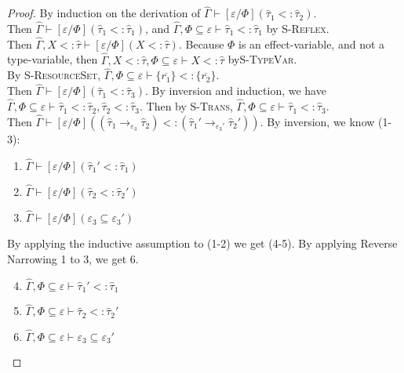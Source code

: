 \documentclass{llncs}
\begin{document}
\begin{proof} By induction on the derivation of $\hat \Gamma \vdash [\varepsilon/\Phi](\hat \tau_1 <: \hat \tau_2)$.\\

 Then $\hat \Gamma \vdash [\varepsilon/\Phi](\hat \tau_1 <: \hat \tau_1)$, and $\hat \Gamma, \Phi \subseteq \varepsilon \vdash \hat \tau_1 <: \hat \tau_1$ by \textsc{S-Reflex}.\\

 Then $\hat \Gamma, X <: \hat \tau \vdash [\varepsilon/\Phi](X <: \hat \tau)$. Because $\Phi$ is an effect-variable, and not a type-variable, then $\hat \Gamma, X <: \hat \tau, \Phi \subseteq \varepsilon \vdash X <: \hat \tau$ by\textsc{S-TypeVar}.\\

 By \textsc{S-ResourceSet}, $\hat \Gamma, \Phi \subseteq \varepsilon \vdash \{ \overline{r_1} \} <: \{ \overline{r_2} \}$.\\

 Then $\hat \Gamma \vdash [\varepsilon/\Phi](\hat \tau_1 <: \hat \tau_3)$. By inversion and induction, we have $\hat \Gamma, \Phi \subseteq \varepsilon \vdash \hat \tau_1 <: \hat \tau_2, \hat \tau_2 <: \hat \tau_3$. Then by \textsc{S-Trans}, $\hat \Gamma, \Phi \subseteq \varepsilon \vdash \hat \tau_1 <: \hat \tau_3$.\\

 Then $\hat \Gamma \vdash [\varepsilon/\Phi]((\hat \tau_1 \rightarrow_{\varepsilon_3} \hat \tau_2) <: (\hat \tau_1' \rightarrow_{\varepsilon_3'} \hat \tau_2'))$. By inversion, we know (1-3):

\begin{enumerate}
	\item $\hat \Gamma \vdash [\varepsilon/\Phi](\hat \tau_1' <: \hat \tau_1)$
	\item $\hat \Gamma \vdash [\varepsilon/\Phi](\hat \tau_2 <: \hat \tau_2')$
	\item $\hat \Gamma \vdash [\varepsilon/\Phi](\varepsilon_3 \subseteq \varepsilon_3')$
\end{enumerate}

\noindent
By applying the inductive assumption to (1-2) we get (4-5). By applying Reverse Narrowing 1 to 3, we get 6.

\begin{enumerate}
	\setcounter{enumi}{3}
	\item $\hat \Gamma, \Phi \subseteq \varepsilon \vdash \hat \tau_1' <: \hat \tau_1$
	\item $\hat \Gamma, \Phi \subseteq \varepsilon \vdash \hat \tau_2 <: \hat \tau_2'$
	\item $\hat \Gamma, \Phi \subseteq \varepsilon \vdash \varepsilon_3 \subseteq \varepsilon_3'$
\end{enumerate}


\end{proof}
\end{document}
